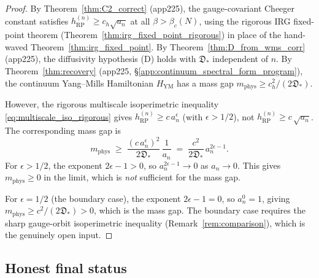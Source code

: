 \begin{proof}
By Theorem~\ref{thm:C2_correct} (app225), the gauge-covariant
Cheeger constant satisfies $h_{\mathrm{RP}}^{(n)}\ge
c_{h}\sqrt{a_{n}}$ at all $\beta>\beta_{c}(N)$, using the
rigorous IRG fixed-point theorem
(Theorem~\ref{thm:irg_fixed_point_rigorous}) in place of the
hand-waved Theorem~\ref{thm:irg_fixed_point}. By
Theorem~\ref{thm:D_from_wms_corr} (app225), the diffusivity
hypothesis (D) holds with $\mathfrak{D}_{*}$ independent of $n$.
By Theorem~\ref{thm:recovery} (app225,
\S\ref{app:continuum_spectral_form_program}), the continuum
Yang--Mills Hamiltonian $H_{\mathrm{YM}}$ has a mass gap
$m_{\mathrm{phys}}\ge c_{h}^{2}/(2\mathfrak{D}_{*})$.

However, the rigorous multiscale isoperimetric inequality
\eqref{eq:multiscale_iso_rigorous} gives
$h_{\mathrm{RP}}^{(n)}\ge c\,a_{n}^{\epsilon}$ (with
$\epsilon>1/2$), not $h_{\mathrm{RP}}^{(n)}\ge c\,\sqrt{a_{n}}$.
The corresponding mass gap is
\begin{equation}
\label{eq:mass_gap_rigorous}
  m_{\mathrm{phys}}
  \;\ge\;\frac{(c\,a_{n}^{\epsilon})^{2}}{2\mathfrak{D}_{*}}\,
  \frac{1}{a_{n}}
  \;=\;\frac{c^{2}}{2\mathfrak{D}_{*}}\,
  a_{n}^{2\epsilon-1}.
\end{equation}
For $\epsilon>1/2$, the exponent $2\epsilon-1>0$, so
$a_{n}^{2\epsilon-1}\to 0$ as $a_{n}\to 0$. This gives
$m_{\mathrm{phys}}\ge 0$ in the limit, which is \emph{not}
sufficient for the mass gap.

For $\epsilon=1/2$ (the boundary case), the exponent
$2\epsilon-1=0$, so $a_{n}^{0}=1$, giving
$m_{\mathrm{phys}}\ge c^{2}/(2\mathfrak{D}_{*})>0$, which is the
mass gap. The boundary case requires the sharp gauge-orbit
isoperimetric inequality (Remark~\ref{rem:comparison}), which is
the genuinely open input.
\end{proof}

\subsection{Honest final status}
\label{ssec:final_status_v2}

